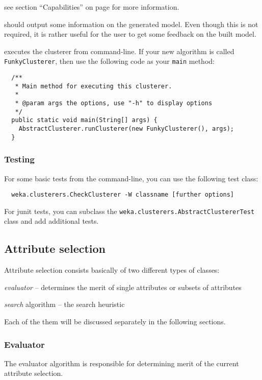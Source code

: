 see section ``Capabilities'' on page \pageref{classifier_capabilities} for more
information.

should output some information on the generated model. Even though this is not
required, it is rather useful for the user to get some feedback on the built
model.

executes the clusterer from command-line. If your new algorithm is called
\texttt{FunkyClusterer}, then use the following code as your \texttt{main}
method:
\begin{verbatim}
  /**
   * Main method for executing this clusterer.
   *
   * @param args the options, use "-h" to display options
   */
  public static void main(String[] args) {
    AbstractClusterer.runClusterer(new FunkyClusterer(), args);
  }
\end{verbatim}

\subsubsection*{Testing}
For some basic tests from the command-line, you can use the following test
class:
\begin{verbatim}
  weka.clusterers.CheckClusterer -W classname [further options]
\end{verbatim}
For junit tests, you can subclass the
\texttt{weka.clusterers.AbstractClustererTest} class and add additional tests.


\newpage
\subsection{Attribute selection}
Attribute selection consists basically of two different types of classes:
\begin{tight_itemize}
  \item \textit{evaluator} -- determines the merit of single attributes or
subsets of attributes
  \item \textit{search} algorithm -- the search heuristic
\end{tight_itemize}
Each of the them will be discussed separately in the following sections.

\subsubsection*{Evaluator}
The evaluator algorithm is responsible for determining merit of the current
attribute selection.

